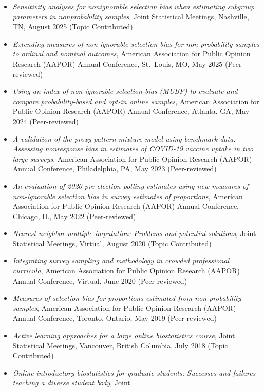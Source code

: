\documentclass[
  english,
  letterpaper,
  DIV=11,
  numbers=noendperiod]{scrartcl}
\providecommand{\tightlist}{%
  \setlength{\itemsep}{0pt}\setlength{\parskip}{0pt}}
\begin{document}
\begin{itemize}
\tightlist
\item
  \emph{Sensitivity analyses for nonignorable selection bias when
  estimating subgroup parameters in nonprobability samples}, Joint
  Statistical Meetings, Nashville, TN, August 2025 (Topic Contributed)
\item
  \emph{Extending measures of non-ignorable selection bias for
  non-probability samples to ordinal and nominal outcomes}, American
  Association for Public Opinion Research (AAPOR) Annual Conference,
  St.~Louis, MO, May 2025 (Peer-reviewed)
\item
  \emph{Using an index of non-ignorable selection bias (MUBP) to
  evaluate and compare probability-based and opt-in online samples},
  American Association for Public Opinion Research (AAPOR) Annual
  Conference, Atlanta, GA, May 2024 (Peer-reviewed)
\item
  \emph{A validation of the proxy pattern mixture model using benchmark
  data: Assessing nonresponse bias in estimates of COVID-19 vaccine
  uptake in two large surveys}, American Association for Public Opinion
  Research (AAPOR) Annual Conference, Philadelphia, PA, May 2023
  (Peer-reviewed)
\item
  \emph{An evaluation of 2020 pre-election polling estimates using new
  measures of non-ignorable selection bias in survey estimates of
  proportions}, American Association for Public Opinion Research (AAPOR)
  Annual Conference, Chicago, IL, May 2022 (Peer-reviewed)
\item
  \emph{Nearest neighbor multiple imputation: Problems and potential
  solutions}, Joint Statistical Meetings, Virtual, August 2020 (Topic
  Contributed)
\item
  \emph{Integrating survey sampling and methodology in crowded
  professional curricula}, American Association for Public Opinion
  Research (AAPOR) Annual Conference, Virtual, June 2020 (Peer-reviewed)
\item
  \emph{Measures of selection bias for proportions estimated from
  non-probability samples}, American Association for Public Opinion
  Research (AAPOR) Annual Conference, Toronto, Ontario, May 2019
  (Peer-reviewed)
\item
  \emph{Active learning approaches for a large online biostatistics
  course}, Joint Statistical Meetings, Vancouver, British Columbia, July
  2018 (Topic Contributed)
\item
  \emph{Online introductory biostatistics for graduate students:
  Successes and failures teaching a diverse student body}, Joint

\end{itemize}
\end{document}
